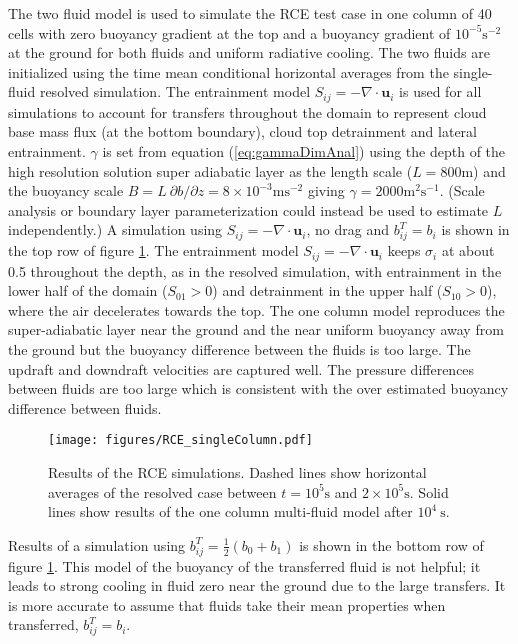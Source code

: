 \documentclass[draft]{agujournal2019}
\begin{document}
The two fluid model is used to simulate the RCE test case in one
column of 40 cells with zero buoyancy gradient at the top and a buoyancy
gradient of $10^{-5}\text{s}^{-2}$ at the ground for both fluids
and uniform radiative cooling. The two fluids are initialized using
the time mean conditional horizontal averages from the single-fluid
resolved simulation. The entrainment model $S_{ij}=-\nabla\cdot\mathbf{u}_{i}$
is used for all simulations to account for transfers throughout the
domain to represent cloud base mass flux (at the bottom boundary),
cloud top detrainment and lateral entrainment. $\gamma$ is set from
equation (\ref{eq:gammaDimAnal}) using the depth of the high resolution solution super adiabatic
layer as the length scale ($L=800\text{m}$) and the buoyancy scale
$B=L\ \partial b/\partial z=8\times10^{-3}\text{m}\text{s}^{-2}$
giving $\gamma=2000\text{m}^{2}\text{s}^{-1}$. (Scale analysis or boundary layer parameterization could instead be used to estimate $L$ independently.)
A simulation using
$S_{ij}=-\nabla\cdot\mathbf{u}_{i}$, no drag and $b_{ij}^{T}=b_{i}$
is shown in the top row of figure \ref{fig:RCE_singleColumn}.
The entrainment model $S_{ij}=-\nabla\cdot\mathbf{u}_{i}$ keeps $\sigma_{i}$
at about 0.5 throughout the depth, as in the resolved simulation,
with entrainment in the lower half of the domain ($S_{01}>0$) and
detrainment in the upper half ($S_{10}>0$), where the air decelerates
towards the top. The one column model reproduces the super-adiabatic
layer near the ground and the near uniform buoyancy away from the
ground but the buoyancy difference between the fluids is too large.
The updraft and downdraft velocities are captured well. The pressure
differences between fluids are too large which is consistent with
the over estimated buoyancy difference between fluids. 

\begin{figure}
\noindent
\texttt{[image: figures/RCE\_singleColumn.pdf]}
\caption{\label{fig:RCE_singleColumn}
Results of the RCE simulations. Dashed lines show horizontal averages
of the resolved case between $t=10^{5}\text{s}$ and $2\times10^{5}\text{s}$. Solid lines show results of the one column multi-fluid model after $10^{4}\ \text{s}$. }
\end{figure}

Results of a simulation using $b_{ij}^{T}=\frac{1}{2}(b_{0}+b_{1})$
is shown in the bottom row of figure \ref{fig:RCE_singleColumn}.
This model of the buoyancy of the transferred fluid is not helpful; it leads
to strong cooling in fluid zero near the ground due to the large transfers.
It is more accurate to assume that fluids take their mean properties
when transferred, $b_{ij}^{T}=b_{i}$. 
\end{document}
